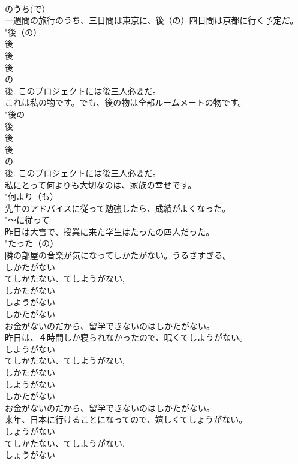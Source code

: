 \documentclass[8pt]{extreport}
\begin{document}
\begin{CJK}{UTF8}{min}
{\\	のうち(で）
\\	一週間の旅行のうち、三日間は東京に、後（の）四日間は京都に行く予定だ。	
\\	"後（の）
\\	後 
\\	後 
\\	後 
\\	の 
\\	後. このプロジェクトには後三人必要だ。
\\	これは私の物です。でも、後の物は全部ルームメートの物です。	
\\	"後の
\\	後 
\\	後 
\\	後 
\\	の 
\\	後. このプロジェクトには後三人必要だ。
\\	私にとって何よりも大切なのは、家族の幸せです。	
\\	"何より（も） 
\\	先生のアドバイスに従って勉強したら、成績がよくなった。	
\\	"〜に従って 
\\	昨日は大雪で、授業に来た学生はたったの四人だった。	
\\	"たった（の）
\\	隣の部屋の音楽が気になってしかたがない。うるさすぎる。	
\\	しかたがない 
\\	てしかたない、てしようがない,
\\	しかたがない 
\\	しようがない 
\\	しかたがない 
\\	お金がないのだから、留学できないのはしかたがない。
\\	昨日は、４時間しか寝られなかったので、眠くてしようがない。	
\\	しようがない 
\\	てしかたない、てしようがない,
\\	しかたがない 
\\	しようがない 
\\	しかたがない 
\\	お金がないのだから、留学できないのはしかたがない。
\\	来年、日本に行けることになってので、嬉しくてしょうがない。	
\\	しょうがない 
\\	てしかたない、てしようがない,
\\	しょうがない　
}
\end{CJK}
\end{document}
